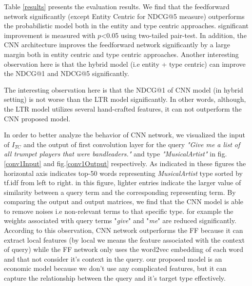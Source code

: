 Table \ref{results} presents the evaluation results. We find that the feedforward network significantly (except Entity Centric for NDCG@5 measure) outperforms the probabilistic model both in the entity and type centric approaches. significant improvement is measured with $p$<0.05 using two-tailed pair-test. In addition, the CNN architecture improves the feedforward network significantly by a large margin both in entity centric and type centric approaches. Another interesting observation here is that the hybrid model (i.e entity + type centric) can improve the NDCG@1 and NDCG@5 significantly.

The interesting observation here is that the NDCG@1 of CNN model (in hybrid setting) is not worse than the LTR model significantly. In other words, although, the LTR model utilizes several hand-crafted features, it can not outperform the CNN proposed model.

In order to better analyze the behavior of CNN network, we visualized the input of $I_{TC}$ and the output of first convolution layer for the query \textit{"Give me a list of all trumpet players that were bandleaders."} and type \textit{"MusicalArtist"} in fig.\ref{conv1Input} and fig.\ref{conv1Output} respectively. As indicated in these figures the horizontal axis indicates top-50 words representing \textit{MusicalArtist} type sorted by tf.idf from left to right. in this figure, lighter entries indicate the larger value of similarity between a query term and the corresponding representing term. By comparing the output and output matrices, we find that the CNN model is able to remove noises i.e non-relevant terms to that specific type. for example the weights associated with query terms "\textit{give}" and "\textit{me}" are reduced significantly. According to this observation, CNN network outperforms the FF because it can extract local features (by local we means the feature associated with the context of query) while the FF network only uses the word2vec embedding of each word and that not consider it's context in the query. our proposed model is an economic model because we don't use any complicated features, but it can capture the relationship between the query and it's target type effectively.     





